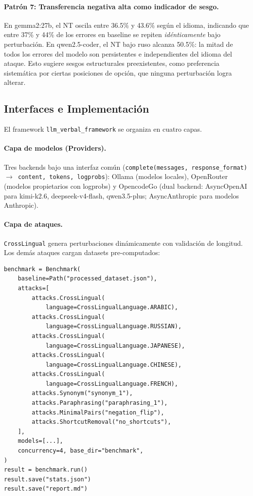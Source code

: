\documentclass[11pt]{article}
\begin{document}
\paragraph{Patrón 7: Transferencia negativa alta como indicador de sesgo.}
En gemma2:27b, el NT oscila entre 36.5\% y 43.6\% según el idioma,
indicando que entre 37\% y 44\% de los errores en baseline se repiten
\textit{idénticamente} bajo perturbación. En qwen2.5-coder, el NT
bajo ruso alcanza 50.5\%: la mitad de todos los errores del modelo son
persistentes e independientes del idioma del ataque. Esto sugiere
sesgos estructurales preexistentes, como preferencia sistemática por
ciertas posiciones de opción, que ninguna perturbación logra alterar.
 
\subsection{Interfaces e Implementación}
 
El framework \texttt{llm\_verbal\_framework} se organiza en cuatro
capas.
 
\paragraph{Capa de modelos (Providers).}
Tres backends bajo una interfaz común
(\texttt{complete(messages, response\_format) $\to$ content, tokens,
logprobs}): Ollama (modelos locales), OpenRouter (modelos propietarios
con logprobs) y OpencodeGo (dual backend: AsyncOpenAI para kimi-k2.6,
deepseek-v4-flash, qwen3.5-plus; AsyncAnthropic para modelos Anthropic).
 
\paragraph{Capa de ataques.}
\texttt{CrossLingual} genera perturbaciones dinámicamente con validación
de longitud. Los demás ataques cargan datasets pre-computados:
 
\begin{verbatim}
benchmark = Benchmark(
    baseline=Path("processed_dataset.json"),
    attacks=[
        attacks.CrossLingual(
            language=CrossLingualLanguage.ARABIC),
        attacks.CrossLingual(
            language=CrossLingualLanguage.RUSSIAN),
        attacks.CrossLingual(
            language=CrossLingualLanguage.JAPANESE),
        attacks.CrossLingual(
            language=CrossLingualLanguage.CHINESE),
        attacks.CrossLingual(
            language=CrossLingualLanguage.FRENCH),
        attacks.Synonym("synonym_1"),
        attacks.Paraphrasing("paraphrasing_1"),
        attacks.MinimalPairs("negation_flip"),
        attacks.ShortcutRemoval("no_shortcuts"),
    ],
    models=[...],
    concurrency=4, base_dir="benchmark",
)
result = benchmark.run()
result.save("stats.json")
result.save("report.md")
\end{verbatim}
 
\end{document}

